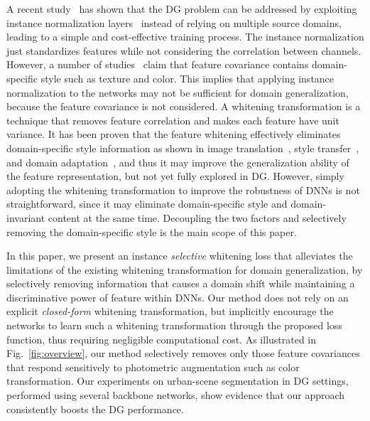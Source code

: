 \documentclass[final]{latex/cvpr}
\begin{document}
A recent study~\cite{pan2018two} has shown that the DG problem can be addressed by exploiting instance normalization layers~\cite{ulyanov2016instance} instead of relying on multiple source domains, leading to a simple and cost-effective training process. The instance normalization just standardizes features while not considering the correlation between channels.
However, a number of studies~\cite{gatys2015texture,gatys2016image,li2017universal,siarohin2018whitening,roy2019unsupervised,luo2017learning,cho2019image,pan2019switchable,sun2016deep} claim that feature covariance contains domain-specific style such as texture and color. This implies that applying instance normalization to the networks may not be sufficient for domain generalization, because the feature covariance is not considered.
A whitening transformation is a technique that removes feature correlation and makes each feature have unit variance. It has been proven that the feature whitening effectively eliminates domain-specific style information as shown in image translation~\cite{cho2019image}, style transfer~\cite{li2017universal}, and domain adaptation~\cite{pan2019switchable,sun2016deep,roy2019unsupervised}, and thus it may improve the generalization ability of the feature representation, but not yet fully explored in DG.
However, simply adopting the whitening transformation to improve the robustness of DNNs is not straightforward, since it may eliminate domain-specific style and domain-invariant content at the same time. Decoupling the two factors and selectively removing the domain-specific style is the main scope of this paper.


In this paper, we present an instance \emph{selective} whitening loss that alleviates the limitations of the existing whitening transformation for domain generalization, by selectively removing information that causes a domain shift while maintaining a discriminative power of feature within DNNs. Our method does not rely on an explicit \emph{closed-form} whitening transformation, but implicitly encourage the networks to learn such a whitening transformation through the proposed loss function, thus requiring negligible computational cost.
As illustrated in Fig.~\ref{fig:overview}, our method selectively removes only those feature covariances that respond sensitively to photometric augmentation such as color transformation.
Our experiments on urban-scene segmentation in DG settings, performed using several backbone networks, show evidence that our approach consistently boosts the DG performance.
\end{document}
